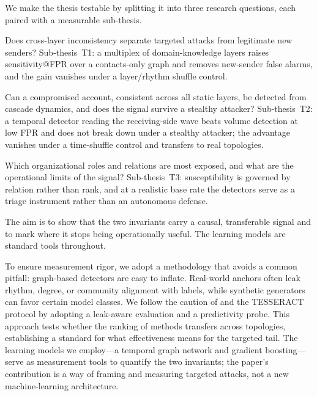We make the thesis testable by splitting it into three research
questions, each paired with a measurable sub-thesis.
\begin{description}[leftmargin=1.4em,noitemsep,topsep=2pt]
  \item[RQ1 (static signal).] Does cross-layer inconsistency separate targeted attacks from legitimate new
  senders? Sub-thesis~T1: a multiplex of domain-knowledge layers raises sensitivity@FPR over a contacts-only
  graph and removes new-sender false alarms, and the gain vanishes under a layer/rhythm shuffle control.
  \item[RQ2 (temporal signal).] Can a compromised account, consistent across all static layers, be detected from
  cascade dynamics, and does the signal survive a stealthy attacker? Sub-thesis~T2: a temporal detector reading
  the receiving-side wave beats volume detection at low FPR and does not break down under a stealthy attacker; the
  advantage vanishes under a time-shuffle control and transfers to real topologies.
  \item[RQ3 (measurement and limits).] Which organizational roles and relations are most exposed, and what are the
  operational limits of the signal? Sub-thesis~T3: susceptibility is governed by relation rather than rank, and at
  a realistic base rate the detectors serve as a triage instrument rather than an autonomous defense.
\end{description}
\noindent The aim is to show that the two invariants carry a causal, transferable signal and to mark where it
stops being operationally useful. The learning models are standard tools throughout.

To ensure measurement rigor, we adopt a methodology that avoids a common pitfall: graph-based detectors are
easy to inflate. Real-world anchors often leak rhythm, degree, or community alignment with labels, while
synthetic generators can favor certain model classes. We follow the caution of
\citet{arp2022dos} and the TESSERACT protocol \citep{pendlebury2019tesseract} by adopting a leak-aware
evaluation and a predictivity probe. This approach tests whether the ranking of methods transfers across
topologies, establishing a standard for what effectiveness means for the targeted tail. The learning models we employ---a temporal graph network and gradient boosting---serve as measurement
tools to quantify the two invariants; the paper's contribution is a way of framing and measuring targeted
attacks, not a new machine-learning architecture.


